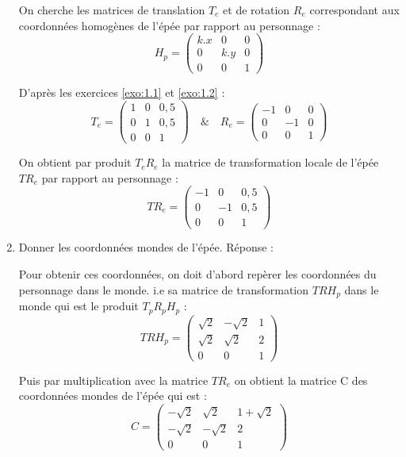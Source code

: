 \documentclass[a4paper,12pt]{article}
\begin{document}
\begin{enumerate}
On cherche les matrices de translation $T_e$ et de rotation $R_e$ correspondant aux coordonnées homogènes de l'épée par rapport au personnage : 
\[
H_p = 
\begin{pmatrix}
k.x & 0 & 0 \\
0 & k.y & 0 \\
0 & 0 & 1
\end{pmatrix}\]

D'après les exercices \ref{exo:1.1} et \ref{exo:1.2} : \newline
\[
T_e = 
\begin{pmatrix}
1 & 0 & 0,5 \\
0 & 1 & 0,5 \\
0 & 0 & 1
\end{pmatrix}
\quad \& \quad
R_e = 
\begin{pmatrix}
-1 & 0 & 0 \\
0 & -1 & 0 \\
0 & 0 & 1
\end{pmatrix}\]

On obtient par produit $T_e R_e$ la matrice de transformation locale de l'épée $TR_e$ par rapport au personnage : 
\[\boxed{
TR_e = 
\begin{pmatrix}
-1 & 0 & 0,5 \\
0 & -1 & 0,5 \\
0 & 0 & 1
\end{pmatrix}}\]

    \item Donner les coordonnées mondes de l'épée.\newline \newline
Réponse :

Pour obtenir ces coordonnées, on doit d'abord repèrer les coordonnées du personnage dans le monde. i.e sa matrice de transformation $TRH_p$ dans le monde qui est le produit $T_p R_p H_p$ :
\[\boxed{
TRH_p = 
\begin{pmatrix}
\sqrt{2} & -\sqrt{2} & 1 \\
\sqrt{2} & \sqrt{2} & 2 \\
0 & 0 & 1
\end{pmatrix}}\]

Puis par multiplication avec la matrice $TR_e$ on obtient la matrice C des coordonnées mondes de l'épée qui est :
\[\boxed{
C = 
\begin{pmatrix}
-\sqrt{2} & \sqrt{2} & 1+\sqrt{2} \\
-\sqrt{2} & -\sqrt{2} & 2 \\
0 & 0 & 1
\end{pmatrix}}\]

\end{enumerate}
\end{document}
